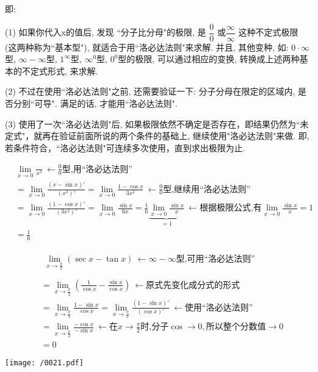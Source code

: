 \documentclass[UTF8]{ctexart}
\begin{document}
即: 

(1) 如果你代入x的值后, 发现 ``分子比分母"的极限, 是 $ \dfrac{0} {0}$ 或$ \dfrac{\infty} {\infty}$ 这种不定式极限 (这两种称为``基本型"), 就适合于用``洛必达法则"来求解. 并且, 其他变种, 如: $ 0 \cdot \infty$型, $\infty-\infty$型, $1^{\infty}$型, $\infty^0$型, $0^0$型的极限,  可以通过相应的变换, 转换成上述两种基本的不定式形式, 来求解.

(2) 不过在使用``洛必达法则"之前, 还需要验证一下: 分子分母在限定的区域内, 是否分别``可导". 满足的话, 才能用``洛必达法则".

(3) 使用了一次``洛必达法则"后, 如果极限依然不确定是否存在，即结果仍然为``未定式"，就再在验证前面所说的两个条件的基础上, 继续使用"洛必达法则"来做.  即, 若条件符合，``洛必达法则"可连续多次使用，直到求出极限为止. \\


\begin{myEnvSample}
	\begin{align*}  %
		&\lim_{x\rightarrow 0}\frac{}{x^3}\ \gets \frac{0}{0}\text{型,用}\text{洛必达法则}\\
		&=\lim_{x\rightarrow 0}\frac{\left( x-\sin x \right) '}{\left( x^3 \right) '}=\lim_{x\rightarrow 0}\frac{1-\cos x}{3x^2}\ \gets \frac{0}{0}\text{型,继续用}\text{洛必达法则}\\
		&=\lim_{x\rightarrow 0}\frac{\left( 1-\cos x \right) '}{\left( 3x^2 \right) '}=\lim_{x\rightarrow 0}\frac{\sin x}{6x}=\frac{1}{6}\underset{=1}{\underbrace{\lim_{x\rightarrow 0}\frac{\sin x}{x}}}\ \gets \text{根据极限公式,有}\lim_{x\rightarrow 0}\frac{\sin x}{x}=1\\
		&=\frac{1}{6}
	\end{align*}
\end{myEnvSample}




\begin{myEnvSample}
	\begin{align*}  %
		&\begin{matrix}
			\lim_{x\rightarrow \frac{\pi}{2}}\left( \sec x-\tan x \right) \ \gets \infty -\infty \text{型,可用}\text{洛必达法则}\\
		\end{matrix}\\
		&=\lim_{x\rightarrow \frac{\pi}{2}}\left( \frac{1}{\cos x}-\frac{\sin x}{\cos x} \right) \ \gets \text{原式先变化成分式的形式}\\
		&=\lim_{x\rightarrow \frac{\pi}{2}}\frac{1-\sin x}{\cos x}=\lim_{x\rightarrow \frac{\pi}{2}}\frac{\left( 1-\sin x \right) '}{\left( \cos x \right) '}\ \gets \text{使用}\text{洛必达法则}\\
		&=\lim_{x\rightarrow \frac{\pi}{2}}\frac{-\cos x}{-\sin x}\ \gets \text{在}x\rightarrow \frac{\pi}{2}\text{时,分子}\cos \rightarrow 0,\text{所以整个分数值}\rightarrow 0\\
		&=0
	\end{align*}
	
	\texttt{[image: /0021.pdf]}
\end{myEnvSample}
\end{document}
